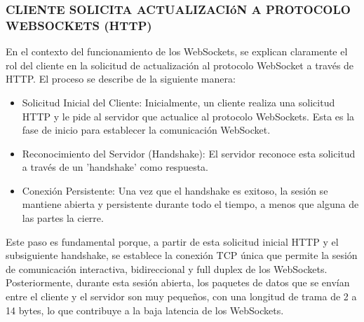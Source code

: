 \documentclass{report}
\begin{document}
\subsubsection{CLIENTE SOLICITA ACTUALIZACIóN A PROTOCOLO WEBSOCKETS (HTTP)}
En el contexto del funcionamiento de los WebSockets, se  explican claramente el rol del cliente en la solicitud de actualización 
al protocolo WebSocket a través de HTTP.
El proceso se describe de la siguiente manera:
\begin{itemize}
    \item Solicitud Inicial del Cliente: Inicialmente, un cliente realiza una solicitud HTTP y le pide al servidor que actualice al protocolo 
    WebSockets. Esta es la fase de inicio para establecer la comunicación WebSocket.
    \item Reconocimiento del Servidor (Handshake): El servidor reconoce esta solicitud a través de un 'handshake' como respuesta.
    \item Conexión Persistente: Una vez que el handshake es exitoso, la sesión se mantiene abierta y persistente durante todo el tiempo, a 
    menos que alguna de las partes la cierre.
\end{itemize}
Este paso es fundamental porque, a partir de esta solicitud inicial HTTP y el subsiguiente handshake, se establece la conexión TCP única que 
permite la sesión de comunicación interactiva, bidireccional y full duplex de los WebSockets. Posteriormente, durante esta sesión abierta, 
los paquetes de datos que se envían entre el cliente y el servidor son muy pequeños, con una longitud de trama de 2 a 14 bytes, lo que contribuye 
a la baja latencia de los WebSockets.
\end{document}
